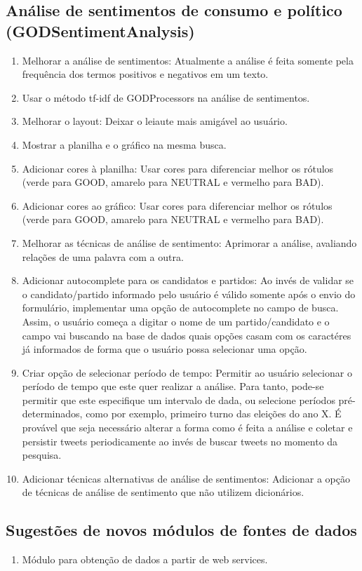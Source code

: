 \subsection{Análise de sentimentos de consumo e político (GODSentimentAnalysis)}
\begin{enumerate}
\item Melhorar a análise de sentimentos: Atualmente a análise é feita somente pela frequência dos termos positivos e negativos em um texto.
\item Usar o método tf-idf de GODProcessors na análise de sentimentos.
\item Melhorar o layout: Deixar o leiaute mais amigável ao usuário.
\item Mostrar a planilha e o gráfico na mesma busca.
\item Adicionar cores à planilha: Usar cores para diferenciar melhor os rótulos (verde para GOOD, amarelo para NEUTRAL e vermelho para BAD).
\item Adicionar cores ao gráfico: Usar cores para diferenciar melhor os rótulos (verde para GOOD, amarelo para NEUTRAL e vermelho para BAD).
\item Melhorar as técnicas de análise de sentimento: Aprimorar a análise, avaliando relações de uma palavra com a outra.
\item Adicionar autocomplete para os candidatos e partidos: Ao invés de validar se o candidato/partido informado pelo usuário é válido somente após o envio do formulário, implementar uma opção de autocomplete no campo de busca. Assim, o usuário começa a digitar o nome de um partido/candidato e o campo vai buscando na base de dados quais opções casam com os caractéres já informados de forma que o usuário possa selecionar uma opção.
\item Criar opção de selecionar período de tempo: Permitir ao usuário selecionar o período de tempo que este quer realizar a análise. Para tanto, pode-se permitir que este especifique um intervalo de dada, ou selecione períodos pré-determinados, como por exemplo, primeiro turno das eleições do ano X. É provável que seja necessário alterar a forma como é feita a análise e coletar e persistir tweets periodicamente ao invés de buscar tweets no momento da pesquisa.
\item Adicionar técnicas alternativas de análise de sentimentos: Adicionar a opção de técnicas de análise de sentimento que não utilizem dicionários.
\end{enumerate}

\subsection{Sugestões de novos módulos de fontes de dados}
\begin{enumerate}
 \item Módulo para obtenção de dados a partir de web services.
\end{enumerate}



